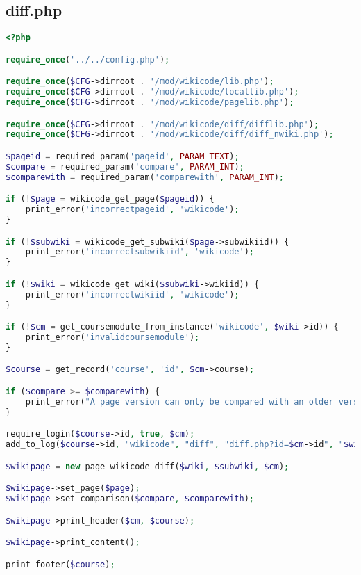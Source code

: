 \subsection{diff.php}
\begin{lstlisting}[language=PHP]
<?php

require_once('../../config.php');

require_once($CFG->dirroot . '/mod/wikicode/lib.php');
require_once($CFG->dirroot . '/mod/wikicode/locallib.php');
require_once($CFG->dirroot . '/mod/wikicode/pagelib.php');

require_once($CFG->dirroot . '/mod/wikicode/diff/difflib.php');
require_once($CFG->dirroot . '/mod/wikicode/diff/diff_nwiki.php');

$pageid = required_param('pageid', PARAM_TEXT);
$compare = required_param('compare', PARAM_INT);
$comparewith = required_param('comparewith', PARAM_INT);

if (!$page = wikicode_get_page($pageid)) {
    print_error('incorrectpageid', 'wikicode');
}

if (!$subwiki = wikicode_get_subwiki($page->subwikiid)) {
    print_error('incorrectsubwikiid', 'wikicode');
}

if (!$wiki = wikicode_get_wiki($subwiki->wikiid)) {
    print_error('incorrectwikiid', 'wikicode');
}

if (!$cm = get_coursemodule_from_instance('wikicode', $wiki->id)) {
    print_error('invalidcoursemodule');
}

$course = get_record('course', 'id', $cm->course);

if ($compare >= $comparewith) {
    print_error("A page version can only be compared with an older version.");
}

require_login($course->id, true, $cm);
add_to_log($course->id, "wikicode", "diff", "diff.php?id=$cm->id", "$wiki->id");

$wikipage = new page_wikicode_diff($wiki, $subwiki, $cm);

$wikipage->set_page($page); 
$wikipage->set_comparison($compare, $comparewith);

$wikipage->print_header($cm, $course);

$wikipage->print_content();

print_footer($course);
\end{lstlisting}

